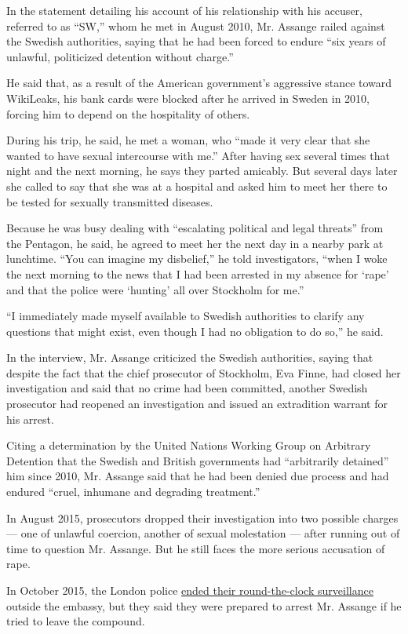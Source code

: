 In the statement detailing his account of his relationship with his
accuser, referred to as ``SW,'' whom he met in August 2010, Mr. Assange
railed against the Swedish authorities, saying that he had been forced
to endure ``six years of unlawful, politicized detention without
charge.''

He said that, as a result of the American government's aggressive stance
toward WikiLeaks, his bank cards were blocked after he arrived in Sweden
in 2010, forcing him to depend on the hospitality of others.

During his trip, he said, he met a woman, who ``made it very clear that
she wanted to have sexual intercourse with me.'' After having sex
several times that night and the next morning, he says they parted
amicably. But several days later she called to say that she was at a
hospital and asked him to meet her there to be tested for sexually
transmitted diseases.

Because he was busy dealing with ``escalating political and legal
threats'' from the Pentagon, he said, he agreed to meet her the next day
in a nearby park at lunchtime. ``You can imagine my disbelief,'' he told
investigators, ``when I woke the next morning to the news that I had
been arrested in my absence for `rape' and that the police were
`hunting' all over Stockholm for me.''

``I immediately made myself available to Swedish authorities to clarify
any questions that might exist, even though I had no obligation to do
so,'' he said.

In the interview, Mr. Assange criticized the Swedish authorities, saying
that despite the fact that the chief prosecutor of Stockholm, Eva Finne,
had closed her investigation and said that no crime had been committed,
another Swedish prosecutor had reopened an investigation and issued an
extradition warrant for his arrest.

Citing a determination by the United Nations Working Group on Arbitrary
Detention that the Swedish and British governments had ``arbitrarily
detained'' him since 2010, Mr. Assange said that he had been denied due
process and had endured ``cruel, inhumane and degrading treatment.''

In August 2015, prosecutors dropped their investigation into two
possible charges --- one of unlawful coercion, another of sexual
molestation --- after running out of time to question Mr. Assange. But
he still faces the more serious accusation of rape.

In October 2015, the London police
\href{http://www.nytimes3xbfgragh.onion/2015/10/13/world/europe/london-police-end-24-hour-watch-at-embassy-housing-julian-assange.html}{ended
their round-the-clock surveillance} outside the embassy, but they said
they were prepared to arrest Mr. Assange if he tried to leave the
compound.

